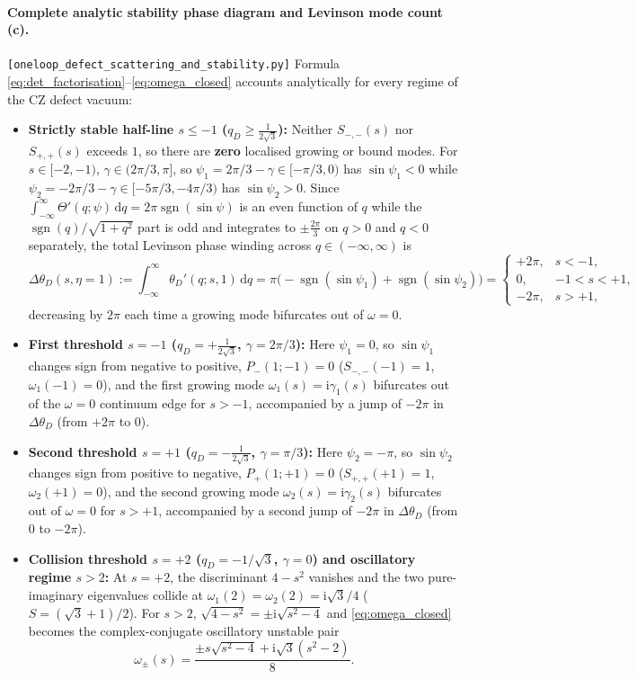 \documentclass[11pt,a4paper]{article}
\newcommand{\dd}{\mathrm{d}}
\newcommand{\ii}{\mathrm{i}}
\newcommand{\sgn}{\operatorname{sgn}}
\begin{document}
\paragraph{Complete analytic stability phase diagram and Levinson mode count \textbf{(c)}.}
\texttt{[oneloop\_defect\_scattering\_and\_stability.py]}
Formula \eqref{eq:det_factorisation}--\eqref{eq:omega_closed} accounts analytically
for every regime of the CZ defect vacuum:
\begin{itemize}
\item \textbf{Strictly stable half-line $s \le -1$ ($q_D \ge \frac{1}{2\sqrt{3}}$):}
Neither $S_{-,-}(s)$ nor $S_{+,+}(s)$ exceeds $1$, so there are \textbf{zero}
localised growing or bound modes. For $s \in [-2,-1)$, $\gamma \in (2\pi/3,\pi]$,
so $\psi_1 = 2\pi/3-\gamma \in [-\pi/3,0)$ has $\sin\psi_1 < 0$ while
$\psi_2 = -2\pi/3-\gamma \in [-5\pi/3,-4\pi/3)$ has $\sin\psi_2 > 0$. Since
$\int_{-\infty}^\infty \Theta'(q;\psi)\,\dd q = 2\pi\sgn(\sin\psi)$ is an even
function of $q$ while the $\sgn(q)/\sqrt{1+q^2}$ part is odd and integrates to
$\pm\frac{2\pi}{3}$ on $q>0$ and $q<0$ separately, the total Levinson phase
winding across $q \in (-\infty,\infty)$ is
\begin{equation}\label{eq:levinson_defect}
  \Delta\theta_D(s,\eta=1) := \int_{-\infty}^\infty \theta_D'(q;s,1)\,\dd q
  = \pi\big(-\sgn(\sin\psi_1) + \sgn(\sin\psi_2)\big)
  = \begin{cases}
    +2\pi, & s < -1,\\
    0, & -1 < s < +1,\\
    -2\pi, & s > +1,
  \end{cases}
\end{equation}
decreasing by $2\pi$ each time a growing mode bifurcates out of $\omega=0$.
\item \textbf{First threshold $s = -1$ ($q_D = +\frac{1}{2\sqrt{3}}$, $\gamma = 2\pi/3$):}
Here $\psi_1 = 0$, so $\sin\psi_1$ changes sign from negative to positive,
$P_-(1;-1) = 0$ ($S_{-,-}(-1) = 1$, $\omega_1(-1) = 0$), and the first growing
mode $\omega_1(s) = \ii\gamma_1(s)$ bifurcates out of the $\omega=0$ continuum
edge for $s > -1$, accompanied by a jump of $-2\pi$ in $\Delta\theta_D$ (from
$+2\pi$ to $0$).
\item \textbf{Second threshold $s = +1$ ($q_D = -\frac{1}{2\sqrt{3}}$, $\gamma = \pi/3$):}
Here $\psi_2 = -\pi$, so $\sin\psi_2$ changes sign from positive to negative,
$P_+(1;+1) = 0$ ($S_{+,+}(+1) = 1$, $\omega_2(+1) = 0$), and the second growing
mode $\omega_2(s) = \ii\gamma_2(s)$ bifurcates out of $\omega=0$ for $s > +1$,
accompanied by a second jump of $-2\pi$ in $\Delta\theta_D$ (from $0$ to $-2\pi$).
\item \textbf{Collision threshold $s = +2$ ($q_D = -1/\sqrt{3}$, $\gamma = 0$) and oscillatory regime $s > 2$:}
At $s = +2$, the discriminant $4-s^2$ vanishes and the two pure-imaginary
eigenvalues collide at $\omega_1(2) = \omega_2(2) = \ii\sqrt{3}/4$ ($S = (\sqrt{3}+1)/2$).
For $s > 2$, $\sqrt{4-s^2} = \pm\ii\sqrt{s^2-4}$ and \eqref{eq:omega_closed}
becomes the complex-conjugate oscillatory unstable pair
\[
  \omega_\pm(s) = \frac{\pm s\sqrt{s^2-4} + \ii\sqrt{3}(s^2-2)}{8}.
\]
\end{itemize}
\end{document}
